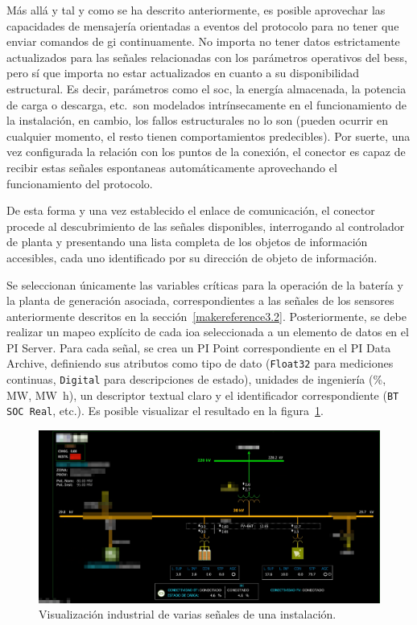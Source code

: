Más allá y tal y como se ha descrito anteriormente, es posible aprovechar las capacidades de mensajería orientadas a eventos del protocolo para no tener que enviar comandos de \gls{gi} continuamente. No importa no tener datos estrictamente actualizados para las señales relacionadas con los parámetros operativos del \gls{bess}, pero sí que importa no estar actualizados en cuanto a su disponibilidad estructural. Es decir, parámetros como el \gls{soc}, la energía almacenada, la potencia de carga o descarga, etc.\ son modelados intrínsecamente en el funcionamiento de la instalación, en cambio, los fallos estructurales no lo son (pueden ocurrir en cualquier momento, el resto tienen comportamientos predecibles). Por suerte, una vez configurada la relación con los puntos de la conexión, el conector es capaz de recibir estas señales espontaneas automáticamente aprovechando el funcionamiento del protocolo.

De esta forma y una vez establecido el enlace de comunicación, el conector procede al descubrimiento de las señales disponibles, interrogando al controlador de planta y presentando una lista completa de los objetos de información accesibles, cada uno identificado por su dirección de objeto de información.

Se seleccionan únicamente las variables críticas para la operación de la batería y la planta de generación asociada, correspondientes a las señales de los sensores anteriormente descritos en la sección~\ref{makereference3.2}. Posteriormente, se debe realizar un mapeo explícito de cada \gls{ioa} seleccionada a un elemento de datos en el PI Server. Para cada señal, se crea un PI Point correspondiente en el PI Data Archive, definiendo sus atributos como tipo de dato (\texttt{Float32} para mediciones continuas, \texttt{Digital} para descripciones de estado), unidades de ingeniería (\si{\percent}, \si{\mega\watt}, \si{\mega\watt\hour}), un descriptor textual claro y el identificador correspondiente (\texttt{BT SOC Real}, etc.). Es posible visualizar el resultado en la figura~\ref{fig:visualizacion-industrial-de-bateria}.

\begin{figure}
  \centering
  \includegraphics[width=0.75\linewidth]{figures/visualizacion-industrial-de-bateria.png}
  \caption[Visualización industrial de señales de instalación.]{Visualización industrial de varias señales de una instalación.}%
  \label{fig:visualizacion-industrial-de-bateria}
\end{figure}


